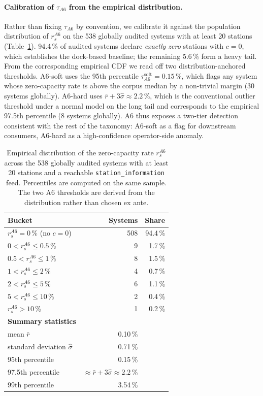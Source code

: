\documentclass[11pt,a4paper]{article}
\begin{document}
\paragraph{Calibration of $\tau_{A6}$ from the empirical distribution.}
Rather than fixing $\tau_{A6}$ by convention, we calibrate it against
the population distribution of $r_s^{A6}$ on the 538 globally audited
systems with at least 20 stations
(Table~\ref{tab:a6-distribution}). 94.4\,\% of audited systems
declare \emph{exactly zero} stations with $c = 0$, which establishes
the dock-based baseline; the remaining 5.6\,\% form a heavy tail.
From the corresponding empirical CDF we read off two
distribution-anchored thresholds. A6-soft uses the 95th percentile
$\tau_{A6}^{\text{soft}} = 0.15\,\%$, which flags any system whose
zero-capacity rate is above the corpus median by a non-trivial
margin (30 systems globally). A6-hard uses $\bar r + 3\hat\sigma
\approx 2.2\,\%$, which is the conventional outlier threshold under
a normal model on the long tail and corresponds to the empirical
97.5th percentile (8 systems globally). A6 thus exposes a two-tier
detection consistent with the rest of the taxonomy: A6-soft as a
flag for downstream consumers, A6-hard as a high-confidence
operator-side anomaly.

\begin{table}[ht]
\centering
\caption{Empirical distribution of the zero-capacity rate
$r_s^{A6}$ across the 538 globally audited systems with at least 20
stations and a reachable \texttt{station\_information} feed.
Percentiles are computed on the same sample. The two A6 thresholds
are derived from the distribution rather than chosen ex ante.}
\label{tab:a6-distribution}
\small
\begin{tabular}{@{}lrr@{}}
\toprule
\textbf{Bucket} & \textbf{Systems} & \textbf{Share}\\
\midrule
$r_s^{A6} = 0$\,\% (no $c = 0$)   & 508 & 94.4\,\% \\
$0 < r_s^{A6} \leq 0.5$\,\%        &   9 &  1.7\,\% \\
$0.5 < r_s^{A6} \leq 1$\,\%        &   8 &  1.5\,\% \\
$1 < r_s^{A6} \leq 2$\,\%          &   4 &  0.7\,\% \\
$2 < r_s^{A6} \leq 5$\,\%          &   6 &  1.1\,\% \\
$5 < r_s^{A6} \leq 10$\,\%         &   2 &  0.4\,\% \\
$r_s^{A6} > 10$\,\%                &   1 &  0.2\,\% \\
\midrule
\textbf{Summary statistics} & & \\
\quad mean $\bar r$                 &  0.10\,\% & \\
\quad standard deviation $\hat\sigma$ &  0.71\,\% & \\
\quad 95th percentile               &  0.15\,\% & \\
\quad 97.5th percentile             &  $\approx \bar r + 3\hat\sigma \approx 2.2$\,\% & \\
\quad 99th percentile               &  3.54\,\% & \\
\bottomrule
\end{tabular}
\end{table}
\end{document}
